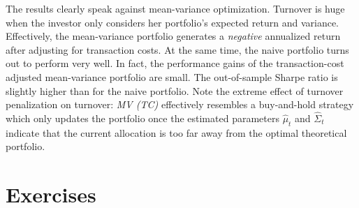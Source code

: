 \documentclass[
]{krantz}
\begin{document}
The results clearly speak against mean-variance optimization. Turnover is huge when the investor only considers her portfolio's expected return and variance. Effectively, the mean-variance portfolio generates a \emph{negative} annualized return after adjusting for transaction costs. At the same time, the naive portfolio turns out to perform very well. In fact, the performance gains of the transaction-cost adjusted mean-variance portfolio are small. The out-of-sample Sharpe ratio is slightly higher than for the naive portfolio. Note the extreme effect of turnover penalization on turnover: \emph{MV (TC)} effectively resembles a buy-and-hold strategy which only updates the portfolio once the estimated parameters \(\hat\mu_t\) and \(\hat\Sigma_t\)indicate that the current allocation is too far away from the optimal theoretical portfolio.

\hypertarget{exercises-10}{%
\section{Exercises}\label{exercises-10}}
\end{document}
